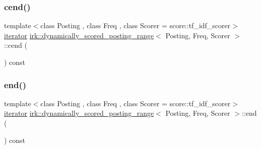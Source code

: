 \mbox{\label{classirk_1_1dynamically__scored__posting__range_ab6bc4bbfdf9ce645df81835b957de595}} 
\subsubsection{\texorpdfstring{cend()}{cend()}}
{\footnotesize\ttfamily template$<$class Posting , class Freq , class Scorer  = score\+::tf\+\_\+idf\+\_\+scorer$>$ \\
\mbox{\hyperlink{classirk_1_1dynamically__scored__posting__range_1_1iterator}{iterator}} \mbox{\hyperlink{classirk_1_1dynamically__scored__posting__range}{irk\+::dynamically\+\_\+scored\+\_\+posting\+\_\+range}}$<$ Posting, Freq, Scorer $>$\+::cend (\begin{DoxyParamCaption}{ }\end{DoxyParamCaption}) const\hspace{0.3cm}{\ttfamily [inline]}}

\mbox{\label{classirk_1_1dynamically__scored__posting__range_a9d5aba54aba865a979c414603ad4ebe4}} 
\subsubsection{\texorpdfstring{end()}{end()}}
{\footnotesize\ttfamily template$<$class Posting , class Freq , class Scorer  = score\+::tf\+\_\+idf\+\_\+scorer$>$ \\
\mbox{\hyperlink{classirk_1_1dynamically__scored__posting__range_1_1iterator}{iterator}} \mbox{\hyperlink{classirk_1_1dynamically__scored__posting__range}{irk\+::dynamically\+\_\+scored\+\_\+posting\+\_\+range}}$<$ Posting, Freq, Scorer $>$\+::end (\begin{DoxyParamCaption}{ }\end{DoxyParamCaption}) const\hspace{0.3cm}{\ttfamily [inline]}}

